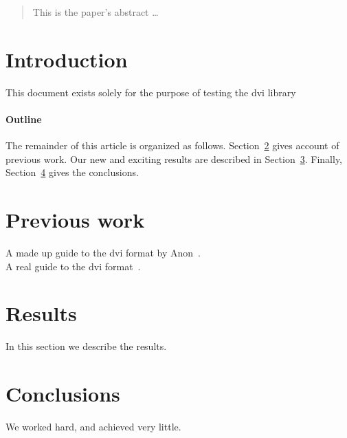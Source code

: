 \documentclass[12pt]{article}
\begin{document}
\maketitle

\begin{abstract}
This is the paper's abstract \ldots
\end{abstract}

\section{Introduction}
This document exists solely for the purpose of testing the dvi library

\paragraph{Outline}
The remainder of this article is organized as follows.
Section~\ref{previous_work} gives account of previous work.
Our new and exciting results are described in Section~\ref{results}.
Finally, Section~\ref{conclusions} gives the conclusions.

\section{Previous work}\label{previous_work}
A made up guide to the dvi format by Anon~\cite{Anon}. \\
A real guide to the dvi format~\cite{Real}.

\section{Results}\label{results}
In this section we describe the results.

\section{Conclusions}\label{conclusions}
We worked hard, and achieved very little.



\end{document}
